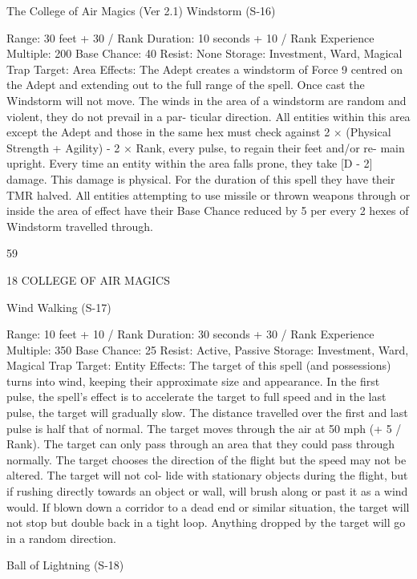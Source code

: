 \begin{Chapter}{The College of Air Magics (Ver 2.1)}
Windstorm (S-16) 

Range: 30 feet + 30 / Rank 
Duration: 10 seconds + 10 / Rank 
Experience Multiple: 200 
Base Chance: 40%
Resist: None 
Storage: Investment, Ward, Magical Trap 
Target: Area 
Effects: The Adept creates a windstorm of Force 9 
centred on the Adept and extending out to the full 
range  of  the  spell.  Once  cast  the  Windstorm  will 
not move. The winds in the area of a windstorm are 
random  and  violent,  they  do  not  prevail  in  a  par-
ticular direction. All entities within this area except 
the  Adept  and  those  in  the  same  hex  must  check 
against  2  ×  (Physical  Strength  +  Agility)  -  2  × 
Rank,  every  pulse,  to  regain  their  feet  and/or  re-
main upright. Every  time  an  entity  within the area 
falls prone, they take [D - 2] damage. This damage 
is physical. For the duration of this spell they have 
their  TMR  halved.  All  entities  attempting  to  use 
missile  or  thrown  weapons  through  or  inside  the 
area of effect have their Base Chance reduced by 5 
per every 2 hexes of Windstorm travelled through. 

59 

18 COLLEGE OF AIR MAGICS 

Wind Walking (S-17) 

Range: 10 feet + 10 / Rank 
Duration: 30 seconds + 30 / Rank 
Experience Multiple: 350 
Base Chance: 25%
Resist: Active, Passive 
Storage: Investment, Ward, Magical Trap 
Target: Entity 
Effects:  The  target  of  this  spell  (and  possessions) 
turns into wind, keeping their approximate size and 
appearance. In the first pulse, the spell’s effect is to 
accelerate  the  target  to  full  speed  and  in  the  last 
pulse,  the  target  will  gradually  slow.  The  distance 
travelled over the first and last pulse is half that of 
normal. The target moves through the air at 50 mph 
(+  5  /  Rank).  The  target  can  only  pass  through  an 
area  that  they  could  pass  through  normally.  The 
target  chooses  the  direction  of  the  flight  but  the 
speed  may  not  be  altered.  The  target  will  not  col-
lide with stationary objects during the flight, but if 
rushing  directly  towards  an  object  or  wall,  will 
brush  along  or  past  it  as  a  wind  would.  If  blown 
down a corridor to a dead end or similar situation, 
the  target  will  not  stop  but  double  back  in  a  tight 
loop.  Anything  dropped  by  the  target  will  go  in  a 
random direction. 

Ball of Lightning (S-18) 


\end{Chapter}
